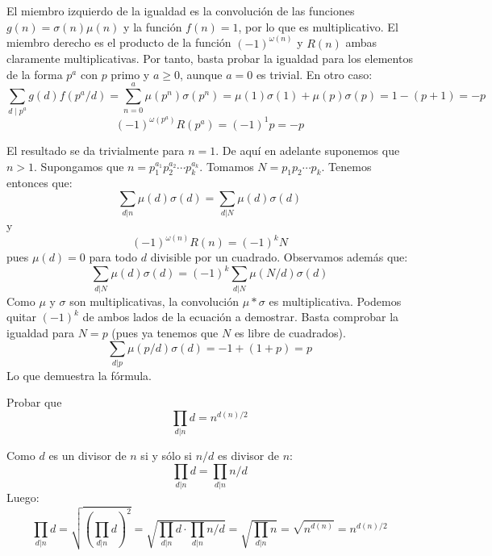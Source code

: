 \documentclass[twoside]{article}
\begin{document}
\begin{ejercicio}{13}
\begin{solucion}
El miembro izquierdo de la igualdad es la convolución de las funciones $g(n)=\sigma(n)\mu(n)$ y la función $f(n)=1$, por lo que es multiplicativo. El miembro derecho es el producto de la función $(-1)^{\omega(n)}$ y $R(n)$ ambas claramente multiplicativas. Por tanto, basta probar la igualdad para los elementos de la forma $p^a$ con $p$ primo y $a\geq 0$, aunque $a=0$ es trivial. En otro caso:
$$
\sum_{d\mid p^a} g(d)f(p^a/d) = \sum_{n=0}^a \mu(p^n)\sigma(p^n) = \mu(1)\sigma(1)+\mu(p)\sigma(p) = 1 - (p+1) = -p 
$$
$$ (-1)^{\omega(p^a)}R(p^a) = (-1)^1p = -p$$
\end{solucion}
\begin{solucion}
El resultado se da trivialmente para $n=1$. De aquí en adelante suponemos que $n>1$.
Supongamos que $n=p_1^{a_1}p_2^{a_2}\cdots p_k^{a_k}$. Tomamos $N=p_1p_2\cdots p_k$. Tenemos entonces que:
\[ \sum_{d|n} μ(d) σ(d) = \sum_{d|N} μ(d) σ(d) \]
y
\[ (-1)^{ω(n)} R(n) = (-1)^k N \]
pues $μ(d)=0$ para todo $d$ divisible por un cuadrado.
Observamos además que:
\[ \sum_{d|N} μ(d) σ(d) = (-1)^k\sum_{d|N} μ(N/d) σ(d) \]
Como $μ$ y $σ$ son multiplicativas, la convolución $μ * σ$ es multiplicativa. Podemos quitar $(-1)^{k}$ de ambos lados de la ecuación a demostrar. Basta comprobar la igualdad para $N=p$ (pues ya tenemos que $N$ es libre de cuadrados).
\[ \sum_{d|p} μ(p/d) σ(d) = -1+(1+p) = p \]
Lo que demuestra la fórmula.
\end{solucion}

\newpage

\begin{ejercicio}{15}
Probar que
\[ \prod_{d|n} d = n^{d(n)/2} \]
\end{ejercicio}

\begin{solucion}
Como $d$ es un divisor de $n$ si y sólo si $n/d$ es divisor de $n$:
\[ \prod_{d|n} d = \prod_{d|n} n/d \]
Luego:
\[ \prod_{d|n} d = \sqrt{\left(\prod_{d|n} d\right)^2} = \sqrt{\prod_{d|n} d \cdot \prod_{d|n} n/d} = \sqrt{\prod_{d|n} n} = \sqrt{n^{d(n)}} = n^{d(n)/2} \]
\end{solucion}
\end{ejercicio}
\end{document}
